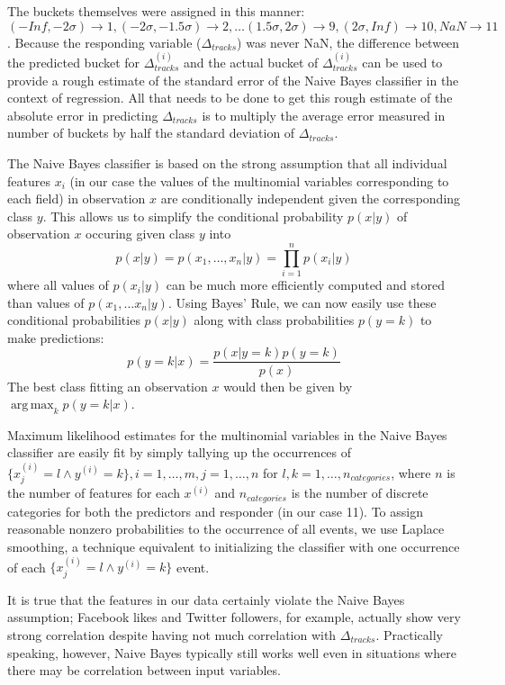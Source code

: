 \documentclass[conference]{IEEEtran}
\DeclareMathOperator*{\argmax}{arg\,max}
\begin{document}
The buckets themselves were assigned in this manner: $(-Inf, -2\sigma)\rightarrow1, (-2\sigma, -1.5\sigma)\rightarrow2,\dots(1.5\sigma,2\sigma)\rightarrow9, (2\sigma,Inf)\rightarrow10, NaN\rightarrow11$. Because the responding variable ($\Delta_{tracks}$) was never NaN, the difference between the predicted bucket for $\Delta_{tracks}^{(i)}$ and the actual bucket of $\Delta_{tracks}^{(i)}$ can be used to provide a rough estimate of the standard error of the Naive Bayes classifier in the context of regression. All that needs to be done to get this rough estimate of the absolute error in predicting $\Delta_{tracks}$ is to multiply the average error measured in number of buckets by half the standard deviation of $\Delta_{tracks}$.

The Naive Bayes classifier is based on the strong assumption that all individual features $x_i$ (in our case the values of the multinomial variables corresponding to each field) in observation $x$ are conditionally independent given the corresponding class $y$. This allows us to simplify the conditional probability $p(x|y)$ of observation $x$ occuring given class $y$ into
$$p(x|y) = p(x_1,\dots,x_n | y) = \prod_{i=1}^n p(x_i|y)$$
where all values of $p(x_i|y)$ can be much more efficiently computed and stored than values of $p(x_1,\dots x_n|y)$. Using Bayes' Rule, we can now easily use these conditional probabilities $p(x|y)$ along with class probabilities $p(y=k)$ to make predictions:
$$p(y=k|x) = \frac{p(x|y=k)p(y=k)}{p(x)}$$
The best class fitting an observation $x$ would then be given by $\argmax_k p(y=k|x)$.

Maximum likelihood estimates for the multinomial variables in the Naive Bayes classifier are easily fit by simply tallying up the occurrences of $\{x^{(i)}_j = l \wedge y^{(i)} = k\}, i=1,\dots,m, j=1,\dots,n$ for $l,k=1,\dots,n_{categories}$, where $n$ is the number of features for each $x^{(i)}$ and $n_{categories}$ is the number of discrete categories for both the predictors and responder (in our case 11). To assign reasonable nonzero probabilities to the occurrence of all events, we use Laplace smoothing, a technique equivalent to initializing the classifier with one occurrence of each $\{x^{(i)}_j = l \wedge y^{(i)} = k\}$ event.

It is true that the features in our data certainly violate the Naive Bayes assumption; Facebook likes and Twitter followers, for example, actually show very strong correlation despite having not much correlation with $\Delta_{tracks}$. Practically speaking, however, Naive Bayes typically still works well even in situations where there may be correlation between input variables.
\end{document}

